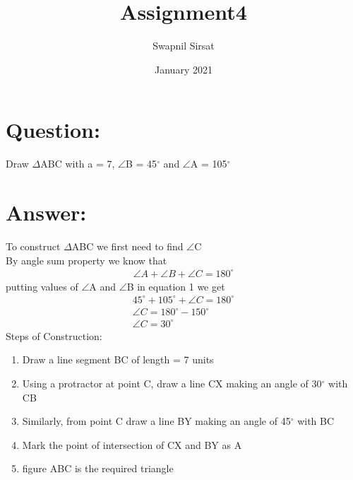 \documentclass{article}
\title{Assignment4}
\author{Swapnil Sirsat}
\date{January 2021}
\begin{document}
\maketitle
\section*{Question: }
Draw $\Delta$ABC with a = 7, $\angle$B = 45$^\circ$
and $\angle$A = 105$^\circ$
\section*{Answer: }
To construct $\Delta$ABC we first need to find $\angle$C\\
By angle sum property we know that
\begin{align}
    \angle A + \angle B + \angle C = 180^\circ
\end{align}
putting values of $\angle$A and $\angle$B in equation 1 we get
\begin{gather*}
    45^\circ + 105^\circ + \angle C = 180^\circ\\
        \angle C = 180^\circ - 150^\circ \\
        \angle C = 30^\circ
\end{gather*}
Steps of Construction: 
\begin{enumerate}
    \item Draw a line segment BC of length = 7 units
    \item Using a protractor at point C, draw a line CX making an angle of 30$^\circ$ with CB
    \item Similarly, from point C draw a line BY making an angle of 45$^\circ$ with BC
    \item Mark the point of intersection of CX and BY as A
    \item figure ABC is the required triangle
\end{enumerate}
\newpage
{}
\end{document}
